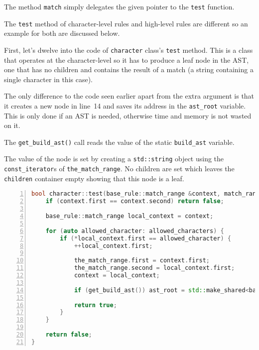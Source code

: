 \documentclass[12pt]{article}
\begin{document}
The method \texttt{match} simply delegates the given pointer to the \texttt{test} function.

The \texttt{test} method of character-level rules and high-level rules are different so an example for both
are discussed below.

First, let's dwelve into the code of \texttt{character} class's \texttt{test} method. This is a class that
operates at the character-level so it has to produce a leaf node in the AST, one that has no children and
contains the result of a match (a string containing a single character in this case).

The only difference to the code seen earlier apart from the extra argument is that it creates a new node in
line~14 and saves its address in the \texttt{ast\_root} variable. This is only done if an AST is needed,
otherwise time and memory is not wasted on it.

The \texttt{get\_build\_ast()} call reads the value of the static \texttt{build\_ast} variable.

The value of the node is set by creating a \texttt{std::string} object using the \texttt{const\_iterator}s of
\texttt{the\_match\_range}. No children are set which leaves the \texttt{children} container empty showing
that this node is a leaf.

\begin{center}
	\begin{minipage}[ht]{0.95\textwidth}
		\begin{lstlisting}[language=C++, breaklines=true, numbers=left]
bool character::test(base_rule::match_range &context, match_range &the_match_range, std::shared_ptr<base_rule::node> &ast_root) {
	if (context.first == context.second) return false;

	base_rule::match_range local_context = context;

	for (auto allowed_character: allowed_characters) {
		if (*local_context.first == allowed_character) {
			++local_context.first;

			the_match_range.first = context.first;
			the_match_range.second = local_context.first;
			context = local_context;

			if (get_build_ast()) ast_root = std::make_shared<base_rule::node>(std::string(the_match_range.first, the_match_range.second)); 

			return true;
		}
	}

	return false;
}
		\end{lstlisting}
	\end{minipage}
\end{center}
\end{document}
